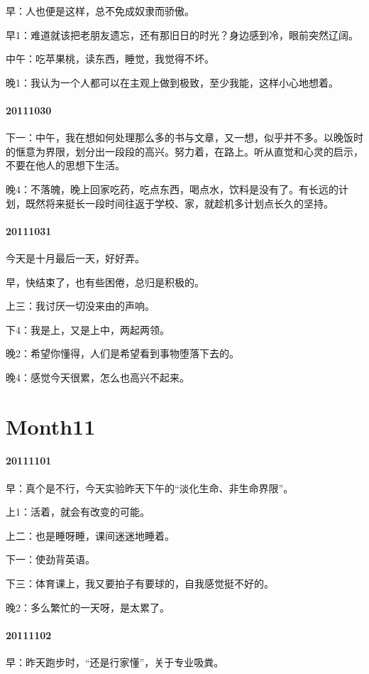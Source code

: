 \documentclass[UTF8]{Diaries}
\begin{document}
早：人也便是这样，总不免成奴隶而骄傲。

早1：难道就该把老朋友遗忘，还有那旧日的时光？身边感到冷，眼前突然辽阔。

中午：吃苹果桃，读东西，睡觉，我觉得不坏。

晚1：我认为一个人都可以在主观上做到极致，至少我能，这样小心地想着。

\paragraph{20111030}
下一：中午，我在想如何处理那么多的书与文章，又一想，似乎并不多。以晚饭时的惬意为界限，划分出一段段的高兴。努力着，在路上。听从直觉和心灵的启示，不要在他人的思想下生活。

晚4：不落魄，晚上回家吃药，吃点东西，喝点水，饮料是没有了。有长远的计划，既然将来挺长一段时间往返于学校、家，就趁机多计划点长久的坚持。

\paragraph{20111031}
今天是十月最后一天，好好弄。

早，快结束了，也有些困倦，总归是积极的。

上三：我讨厌一切没来由的声响。

下4：我是上，又是上中，两起两领。

晚2：希望你懂得，人们是希望看到事物堕落下去的。

晚4：感觉今天很累，怎么也高兴不起来。


\section{Month11}

\paragraph{20111101}
早：真个是不行，今天实验昨天下午的“淡化生命、非生命界限”。

上1：活着，就会有改变的可能。

上二：也是睡呀睡，课间迷迷地睡着。

下一：使劲背英语。

下三：体育课上，我又要拍子有要球的，自我感觉挺不好的。

晚2：多么繁忙的一天呀，是太累了。


\paragraph{20111102}
早：昨天跑步时，“还是行家懂”，关于专业吸粪。
\end{document}
